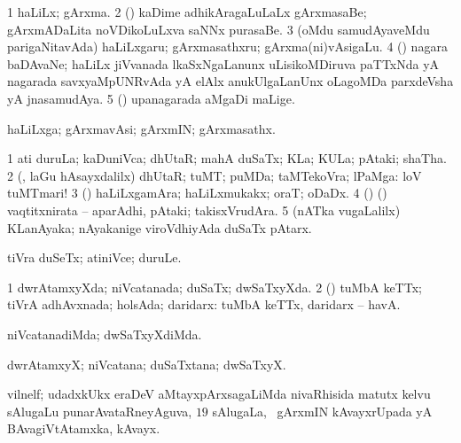 {{{{{{\bentry
{} 
\gl{\nA}
\expl{}
\bmng
\bnum
\num{1} haLiLx; gArxma. 
\num{2} (\ame) kaDime adhikAragaLuLaLx gArxmasaBe; gArxmADaLita noVDikoLuLxva saNNx purasaBe. 
\num{3} (oMdu samudAyaveMdu parigaNitavAda) haLiLxgaru; gArxmasathxru; gArxma(ni)vAsigaLu. 
\num{4} (\birx) nagara baDAvaNe; haLiLx jiVvanada lkaSxNgaLanunx uLisikoMDiruva paTTxNda yA nagarada savxyaMpUNRvAda yA elAlx anukUlgaLanUnx oLagoMDa parxdeVsha yA jnasamudAya. 
\num{5} (\AseTxrXV) upanagarada aMgaDi maLige. 
\enum
\emng
\eentry

\bentry
{} 
\gl{\nA}
\expl{}
\bmng
 haLiLxga; gArxmavAsi; gArxmIN; gArxmasathx. 
\emng
\eentry

\bentry
{} 
\gl{\nA}
\expl{}
\bmng
\bnum
\num{1} ati duruLa; kaDuniVca; dhUtaR; mahA duSaTx; KLa; KULa; pAtaki; shaTha. 
\num{2} (\AmA, laGu hAsayxdalilx) dhUtaR; tuMT; puMDa; taMTekoVra; lPaMga:  loV tuMTmari! 
\num{3} (\pArxparx) haLiLxgamAra; haLiLxmukakx; oraT; oDaDx. 
\num{4} (\birx) (\AmA) vaqtitxnirata -- aparAdhi, pAtaki; takisxVrudAra. 
\hypertarget{villain(5)}{} 
\num{5} (nATka \mo vugaLalilx) KLanAyaka; nAyakanige viroVdhiyAda duSaTx pAtarx. 
\enum
\emng

\noindent 
\gl{\pagu}
\expl{}
\bmng
{} 
\emng
\eentry

\bentry
{} 
\gl{\nA}
\expl{}
\bmng
 tiVra duSeTx; atiniVce; duruLe. 
\emng
\eentry

\bentry
{} 
\gl{\gu}
\expl{}
\bmng
\bnum
\num{1} dwrAtamxyXda; niVcatanada; duSaTx; dwSaTxyXda. 
\num{2} (\AmA) tuMbA keTTx; tiVrA adhAvxnada; holsAda; daridarx:  tuMbA keTTx, daridarx -- havA. 
\enum
\emng
\eentry

\bentry
{} 
\gl{\kirxvi}
\expl{}
\bmng
 niVcatanadiMda; dwSaTxyXdiMda. 
\emng
\eentry

\bentry
{} 
\gl{\nA}
\expl{}
\bmng
\emng
\eentry

\bentry
{} 
\gl{\nA}
\bmng
 dwrAtamxyX; niVcatana; duSaTxtana; dwSaTxyX. 
\emng
\eentry

\bentry
{} 
\gl{\nA}
\expl{}
\bmng
 vilnelf; udadxkUkx eraDeV aMtayxpArxsagaLiMda nivaRhisida matutx kelvu sAlugaLu punarAvataRneyAguva, $19$ sAlugaLa, \sA\ gArxmIN kAvayxrUpada yA BAvagiVtAtamxka, kAvayx. 
\emng
\eentry

}}}}}}

